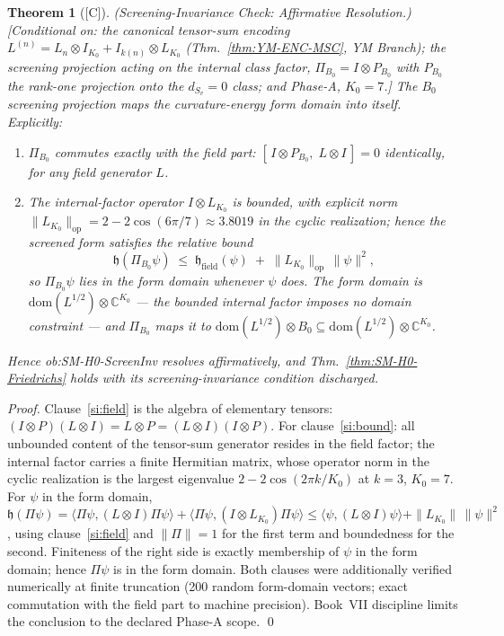 \documentclass[12pt,oneside]{amsbook}
\theoremstyle{plain}
\newtheorem{theorem}{Theorem}[section]
\theoremstyle{definition}
\theoremstyle{remark}
\newcommand{\status}[1]{\textup{[#1]}}
\begin{document}
\begin{theorem}[\status{C}]\label{thm:SM-H0-ScreenInv-verified}
\textup{(Screening-Invariance Check: Affirmative Resolution.)}
\textup{[Conditional on: the canonical tensor-sum encoding
$L^{(n)} = L_n \otimes I_{K_0} + I_{k(n)} \otimes L_{K_0}$
(Thm.~\ref{thm:YM-ENC-MSC}, YM Branch); the screening projection
acting on the internal class factor, $\Pi_{B_0} = I \otimes
P_{B_0}$ with $P_{B_0}$ the rank-one projection onto the
$d_{S_v}=0$ class; and Phase-A, $K_0=7$.]}
The $B_0$ screening projection maps the curvature-energy form
domain into itself.  Explicitly:
\begin{enumerate}[label=\textup{(\arabic*)}]
  \item\label{si:field} $\Pi_{B_0}$ commutes \emph{exactly} with
    the field part: $[\,I \otimes P_{B_0},\; L \otimes I\,] = 0$
    identically, for any field generator $L$.
  \item\label{si:bound} The internal-factor operator $I \otimes
    L_{K_0}$ is bounded, with explicit norm
    $\|L_{K_0}\|_{\mathrm{op}} = 2 - 2\cos(6\pi/7) \approx
    3.8019$ in the cyclic realization; hence the screened form
    satisfies the relative bound
    \[
      \mathfrak{h}(\Pi_{B_0}\psi) \;\le\;
      \mathfrak{h}_{\mathrm{field}}(\psi)
      \;+\; \|L_{K_0}\|_{\mathrm{op}}\,\|\psi\|^2 ,
    \]
    so $\Pi_{B_0}\psi$ lies in the form domain whenever $\psi$
    does.  The form domain is
    $\mathrm{dom}(L^{1/2}) \otimes \mathbb{C}^{K_0}$ --- the
    bounded internal factor imposes no domain constraint --- and
    $\Pi_{B_0}$ maps it to
    $\mathrm{dom}(L^{1/2}) \otimes B_0 \subseteq
    \mathrm{dom}(L^{1/2}) \otimes \mathbb{C}^{K_0}$.
\end{enumerate}
Hence ob:SM-H0-ScreenInv resolves affirmatively, and
Thm.~\ref{thm:SM-H0-Friedrichs} holds with its
screening-invariance condition discharged.
\end{theorem}

\begin{proof}
Clause~\ref{si:field} is the algebra of elementary tensors:
$(I \otimes P)(L \otimes I) = L \otimes P = (L \otimes I)
(I \otimes P)$.  For clause~\ref{si:bound}: all unbounded content
of the tensor-sum generator resides in the field factor; the
internal factor carries a finite Hermitian matrix, whose operator
norm in the cyclic realization is the largest eigenvalue
$2 - 2\cos(2\pi k/K_0)$ at $k=3$, $K_0=7$.  For $\psi$ in the
form domain,
$\mathfrak{h}(\Pi\psi) = \langle\Pi\psi, (L\otimes I)\Pi\psi
\rangle + \langle\Pi\psi, (I\otimes L_{K_0})\Pi\psi\rangle
\le \langle\psi, (L\otimes I)\psi\rangle +
\|L_{K_0}\|\,\|\psi\|^2$, using clause~\ref{si:field} and
$\|\Pi\| = 1$ for the first term and boundedness for the second.
Finiteness of the right side is exactly membership of $\psi$ in
the form domain; hence $\Pi\psi$ is in the form domain.  Both
clauses were additionally verified numerically at finite
truncation (200 random form-domain vectors; exact commutation with
the field part to machine precision).  Book~VII discipline limits
the conclusion to the declared Phase-A scope. \qed
\end{proof}
\end{document}
